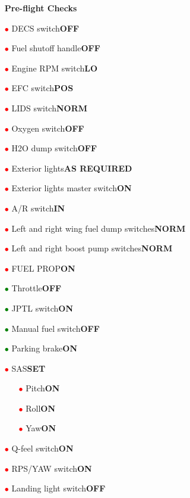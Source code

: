 \documentclass[a4paper,12pt,dvipsnames]{letter}
\newcommand{\radio}[1]{\textcolor{blue}{#1}}
\newcommand{\button}[1]{\textbf{#1}}
\newcommand{\ri}{\textcolor{red}{$\bullet$\;}}
\newcommand{\gi}{\textcolor{Green}{$\bullet$\;}}
\begin{document}
{\begin{itemize}
\end{itemize}
\newpage
\begin{itemize}
\item[] {\LARGE\textbf{Pre-flight Checks}}
\item[\ri] DECS switch\dotfill\button{OFF}
\item[\ri] Fuel shutoff handle\dotfill\button{OFF}
\item[\ri] Engine RPM switch\dotfill\button{LO}
\item[\ri] EFC switch\dotfill\button{POS}
\item[\ri] LIDS switch\dotfill\button{NORM}
\item[\ri] Oxygen switch\dotfill\button{OFF}
\item[\ri] H2O dump switch\dotfill\button{OFF}
\item[\ri] Exterior lights\dotfill\button{AS REQUIRED}
\item[\ri] Exterior lights master switch\dotfill\button{ON}
\item[\ri] A/R switch\dotfill\button{IN}
\item[\ri] Left and right wing fuel dump switches\dotfill\button{NORM}
\item[\ri] Left and right boost pump switches\dotfill\button{NORM}
\item[\ri] FUEL PROP\dotfill\button{ON}
\item[\gi] Throttle\dotfill\button{OFF}
\item[\gi] JPTL switch\dotfill\button{ON}
\item[\gi] Manual fuel switch\dotfill\button{OFF}
\item[\gi] Parking brake\dotfill\button{ON}
\item[\ri] SAS\dotfill\button{SET}
\begin{itemize}
 \item[\ri] Pitch\dotfill\button{ON}
 \item[\ri] Roll\dotfill\button{ON}
 \item[\ri] Yaw\dotfill\button{ON}
\end{itemize}
\item[\ri] Q-feel switch\dotfill\button{ON}
\item[\ri] RPS/YAW switch\dotfill\button{ON}
\item[\ri] Landing light switch\dotfill\button{OFF}

\end{itemize}}
\end{document}
